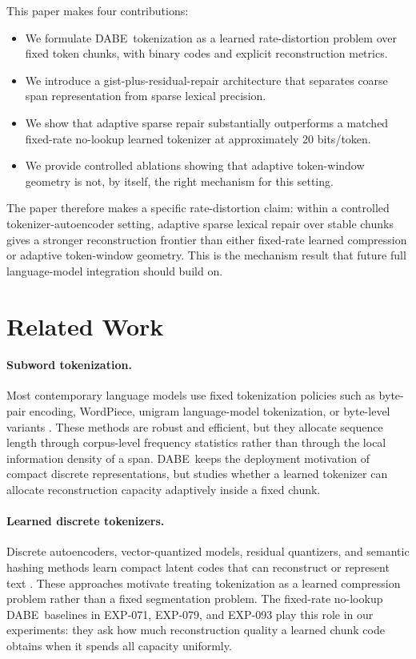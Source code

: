 \documentclass[11pt]{article}
\newcommand{\dabe}{\textsc{DABE}}
\newcommand{\Exp}[1]{\textsc{EXP-#1}}
\newcommand{\bitsper}{bits/token}
\begin{document}
This paper makes four contributions:
\begin{itemize}
  \item We formulate \dabe\ tokenization as a learned rate-distortion problem over fixed token chunks, with binary codes and explicit reconstruction metrics.
  \item We introduce a gist-plus-residual-repair architecture that separates coarse span representation from sparse lexical precision.
  \item We show that adaptive sparse repair substantially outperforms a matched fixed-rate no-lookup learned tokenizer at approximately 20 \bitsper.
  \item We provide controlled ablations showing that adaptive token-window geometry is not, by itself, the right mechanism for this setting.
\end{itemize}

The paper therefore makes a specific rate-distortion claim: within a controlled tokenizer-autoencoder setting, adaptive sparse lexical repair over stable chunks gives a stronger reconstruction frontier than either fixed-rate learned compression or adaptive token-window geometry. This is the mechanism result that future full language-model integration should build on.

\section{Related Work}
\paragraph{Subword tokenization.}
Most contemporary language models use fixed tokenization policies such as byte-pair encoding, WordPiece, unigram language-model tokenization, or byte-level variants \cite{sennrich2016bpe,kudo2018sentencepiece,schuster2012japanese}. These methods are robust and efficient, but they allocate sequence length through corpus-level frequency statistics rather than through the local information density of a span. \dabe\ keeps the deployment motivation of compact discrete representations, but studies whether a learned tokenizer can allocate reconstruction capacity adaptively inside a fixed chunk.

\paragraph{Learned discrete tokenizers.}
Discrete autoencoders, vector-quantized models, residual quantizers, and semantic hashing methods learn compact latent codes that can reconstruct or represent text \cite{vandenoord2017vqvae,kaiser2018discrete}. These approaches motivate treating tokenization as a learned compression problem rather than a fixed segmentation problem. The fixed-rate no-lookup \dabe\ baselines in \Exp{071}, \Exp{079}, and \Exp{093} play this role in our experiments: they ask how much reconstruction quality a learned chunk code obtains when it spends all capacity uniformly.
\end{document}
